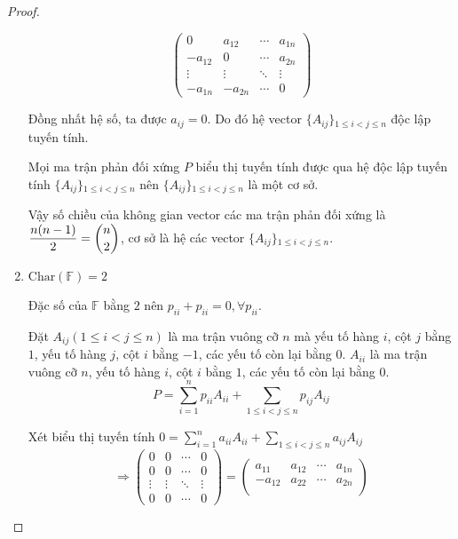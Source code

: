 \documentclass[class=linear-algebra,crop=false]{standalone}
\begin{document}
\begin{proof}
\begin{enumerate}
\[\begin{pmatrix}
                      0       & a_{12}  & \cdots & a_{1n} \\
                      -a_{12} & 0       & \cdots & a_{2n} \\
                      \vdots  & \vdots  & \ddots & \vdots \\
                      -a_{1n} & -a_{2n} & \cdots & 0
                  \end{pmatrix}
              \]
              \par Đồng nhất hệ số, ta được $a_{ij} = 0$. Do đó hệ vector $\{ A_{ij} \}{}_{1\le i < j \le n}$ độc lập tuyến tính.
              \par Mọi ma trận phản đối xứng $P$ biểu thị tuyến tính được qua hệ độc lập tuyến tính $\{ A_{ij} \}{}_{1\le i < j \le n}$ nên $\{ A_{ij} \}{}_{1\le i < j \le n}$ là một cơ sở.
              \par Vậy số chiều của không gian vector các ma trận phản đối xứng là $\dfrac{n(n-1)}{2} = \dbinom{n}{2}$, cơ sở là hệ các vector $\{ A_{ij} \}{}_{1\le i < j \le n}$.
        \item $\text{Char}(\mathbb{F}) = 2$
              \par Đặc số của $\mathbb{F}$ bằng $2$ nên $p_{ii} + p_{ii} = 0, \forall p_{ii}$.
              \par Đặt $A_{ij} (1\le i < j\le n)$ là ma trận vuông cỡ $n$ mà yếu tố hàng $i$, cột $j$ bằng $1$, yếu tố hàng $j$, cột $i$ bằng $-1$, các yếu tố còn lại bằng $0$. $A_{ii}$ là ma trận vuông cỡ $n$, yếu tố hàng $i$, cột $i$ bằng $1$, các yếu tố còn lại bằng $0$.
              \[ P = \sum^{n}_{i=1}p_{ii}A_{ii} + \sum_{1\le i < j \le n}p_{ij}A_{ij} \]
              \par Xét biểu thị tuyến tính $0 = \sum^{n}_{i=1}a_{ii}A_{ii} + \sum_{1\le i < j \le n}a_{ij}A_{ij}$
              \[
                  \Rightarrow
                  \begin{pmatrix}
                      0      & 0      & \cdots & 0      \\
                      0      & 0      & \cdots & 0      \\
                      \vdots & \vdots & \ddots & \vdots \\
                      0      & 0      & \cdots & 0
                  \end{pmatrix} =
                  \begin{pmatrix}
                      a_{11}  & a_{12}  & \cdots & a_{1n} \\
                      -a_{12} & a_{22}  & \cdots & a_{2n} \\

\end{pmatrix}\]
\end{enumerate}
\end{proof}
\end{document}
